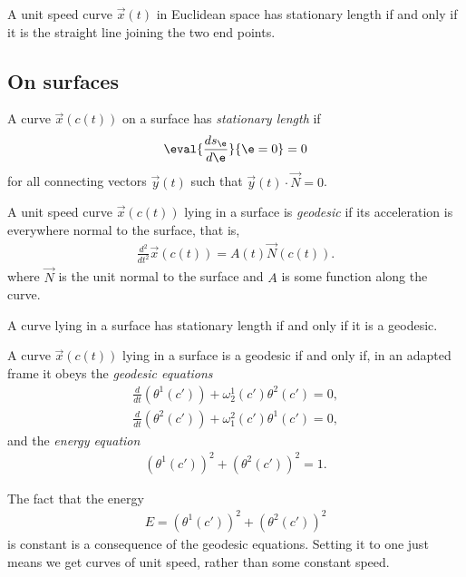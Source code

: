\documentclass{article}
\begin{document}
\begin{proposition}[Notes 12.3]
	A unit speed curve $\vec x(t)$ in Euclidean space has stationary length if and only if
	it is the straight line joining the two end points.
\end{proposition}

\subsection{On surfaces}

\begin{definition}
	A curve $\vec x(c(t))$ on a surface has \emph{stationary length} if
	\begin{align*}
		\eval{\frac{ds_\e}{d\e}}{\e=0}=0
	\end{align*}
	for all connecting vectors $\vec y(t)$ such that $\vec y(t)\cdot\vec N=0$.
\end{definition}

\begin{definition}
	A unit speed curve $\vec x(c(t))$ lying in a surface is \emph{geodesic} if its acceleration
	is everywhere normal to the surface, that is,
	\begin{align*}
		\frac{d^2}{dt^2}\vec x(c(t)) = A(t)\vec N(c(t)).
	\end{align*}
	where $\vec N$ is the unit normal to the surface and $A$ is some function along the curve.
\end{definition}

\begin{proposition}[Notes 12.7]
	A curve lying in a surface has stationary length if and only if it is a geodesic.
\end{proposition}

\begin{proposition}[Notes 12.9]
	A curve $\vec x(c(t))$ lying in a surface is a geodesic if and only if, in an adapted frame
	it obeys the \emph{geodesic equations}
	\begin{align*}
		\frac{d}{dt}(\theta^1 (c')) + \omega_2^1(c')\theta^2(c') = 0, \\
		\frac{d}{dt}(\theta^2 (c')) + \omega_1^2(c')\theta^1(c') = 0,
	\end{align*}
	and the \emph{energy equation}
	\begin{align*}
		(\theta^1(c'))^2 + (\theta^2(c'))^2 = 1.
	\end{align*}
\end{proposition}

\begin{proposition}[Notes 12.11]
	The fact that the energy
	\begin{align*}
		E = (\theta^1(c'))^2 + (\theta^2(c'))^2
	\end{align*}
	is constant is a consequence of the geodesic equations. Setting it to one just means we get
	curves of unit speed, rather than some constant speed.
\end{proposition}
\end{document}
